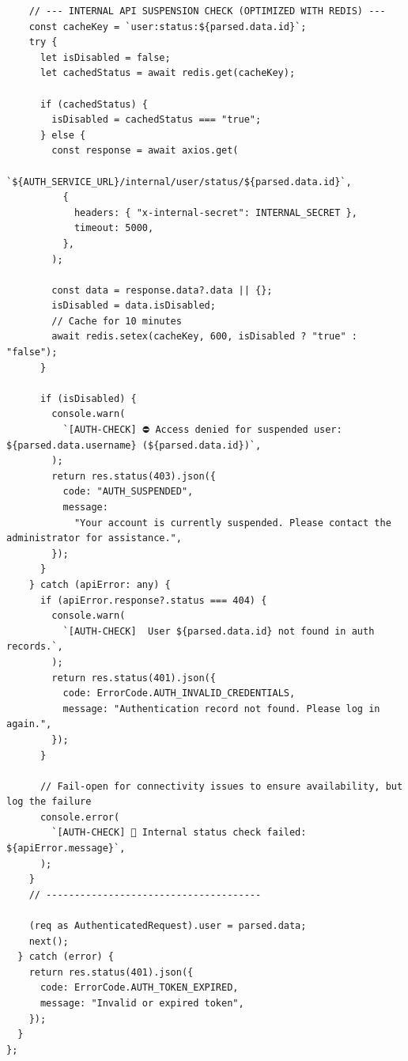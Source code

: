 \documentclass[11pt,a4paper,oneside]{article}
\begin{document}
\begin{lstlisting}
    // --- INTERNAL API SUSPENSION CHECK (OPTIMIZED WITH REDIS) ---
    const cacheKey = `user:status:${parsed.data.id}`;
    try {
      let isDisabled = false;
      let cachedStatus = await redis.get(cacheKey);

      if (cachedStatus) {
        isDisabled = cachedStatus === "true";
      } else {
        const response = await axios.get(
          `${AUTH_SERVICE_URL}/internal/user/status/${parsed.data.id}`,
          {
            headers: { "x-internal-secret": INTERNAL_SECRET },
            timeout: 5000,
          },
        );

        const data = response.data?.data || {};
        isDisabled = data.isDisabled;
        // Cache for 10 minutes
        await redis.setex(cacheKey, 600, isDisabled ? "true" : "false");
      }

      if (isDisabled) {
        console.warn(
          `[AUTH-CHECK] ⛔ Access denied for suspended user: ${parsed.data.username} (${parsed.data.id})`,
        );
        return res.status(403).json({
          code: "AUTH_SUSPENDED",
          message:
            "Your account is currently suspended. Please contact the administrator for assistance.",
        });
      }
    } catch (apiError: any) {
      if (apiError.response?.status === 404) {
        console.warn(
          `[AUTH-CHECK]  User ${parsed.data.id} not found in auth records.`,
        );
        return res.status(401).json({
          code: ErrorCode.AUTH_INVALID_CREDENTIALS,
          message: "Authentication record not found. Please log in again.",
        });
      }

      // Fail-open for connectivity issues to ensure availability, but log the failure
      console.error(
        `[AUTH-CHECK] 🔴 Internal status check failed: ${apiError.message}`,
      );
    }
    // --------------------------------------

    (req as AuthenticatedRequest).user = parsed.data;
    next();
  } catch (error) {
    return res.status(401).json({
      code: ErrorCode.AUTH_TOKEN_EXPIRED,
      message: "Invalid or expired token",
    });
  }
};

\end{lstlisting}
\end{document}
